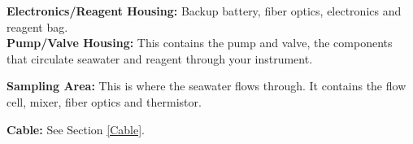     \textbf{Electronics/Reagent Housing:} Backup battery, fiber optics, electronics and reagent bag.\\
    
    \textbf{Pump/Valve Housing:} This contains the pump and valve, the components that circulate seawater and reagent through your instrument.
    
    \textbf{Sampling Area:} This is where the seawater flows through. It contains the flow cell, mixer, fiber optics and thermistor.

    \textbf{Cable:} See Section \ref{Cable}.
    
\fi			%
